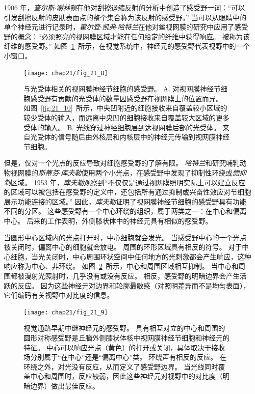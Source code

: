 1906 年，\textit{查尔斯$\cdot$谢林顿}在他对刮擦退缩反射的分析中创造了感受野一词：“可以引发刮擦反射的皮肤表面点的整个集合称为该反射的感受野。” 
当可以从眼睛中的单个神经元进行记录时，\textit{霍尔登$\cdot$凯弗$\cdot$哈特兰}在他对鲎视网膜的研究中应用了感受野的概念：“必须照亮的视网膜区域才能在任何给定的纤维中获得响应。
被称为该纤维的感受野。” 
如图~\ref{fig:21_8}~所示，在视觉系统中，神经元的感受野代表视野中的一个小窗口。


\begin{figure}[htbp]
	\centering
	\texttt{[image: chap21/fig\_21\_8]}
	\caption{与光受体相关的视网膜神经节细胞的感受野。
		A. 对视网膜神经节细胞感受野有贡献的光受体的数量因感受野在视网膜上的位置而异。
		如图~\ref{fig:21_10}~所示，中央凹附近的细胞接收来自覆盖较小区域的较少受体的输入，而远离中央凹的细胞接收来自覆盖较大区域的更多受体的输入。
		B. 光线穿过神经细胞层到达视网膜后部的光受体。
		来自光受体的信号随后由外核层和内核层中的神经元传输到视网膜神经节细胞。}
	\label{fig:21_8}
\end{figure}


但是，仅对一个光点的反应导致对细胞感受野的了解有限。
\textit{哈特兰}和研究哺乳动物视网膜的\textit{斯蒂芬$\cdot$库夫勒}使用两个小光点，在感受野中发现了抑制性环绕或\textit{侧抑制}区域。
1953 年，\textit{库夫勒}观察到“不仅仅是通过视网膜照明实际上可以建立反应的区域可以被包括在感受野的定义中，还包括所有通过抑制或兴奋性效应对节细胞展示功能连接的区域。” 
因此，\textit{库夫勒}证明了视网膜神经节细胞的感受野具有功能不同的分区。
这些感受野有一个中心环绕的组织，属于两类之一：在中心和偏离中心。
后来的工作表明，外侧膝状体中的神经元具有相似的感受野。


当圆形中心区域内的光点打开时，中心细胞就会发光。
当感受野中心的一个光点被关闭时，偏离中心的细胞就会放电。
周围的环形区域具有相反的符号。 
对于中心细胞，当光关闭时，中心周围环状空间中任何地方的光刺激都会产生响应，这种响应称为中心、非环绕。 
如图~\ref{fig:21_9}~所示，中心和周围区域相互抑制。
当中心和周围都被漫射光照射时，几乎没有或没有反应。 
相反，感受野的明暗边界会产生活跃的反应。
因为这些神经元对边界和轮廓最敏感（对照明差异而不是均匀表面），它们编码有关视野中对比度的信息。


\begin{figure}[htbp]
	\centering
	\texttt{[image: chap21/fig\_21\_9]}
	\caption{视觉通路早期中继神经元的感受野。
		具有相互对立的中心和周围的圆形对称感受野是丘脑外侧膝状体核中视网膜神经节细胞和神经元的特征。
		中心可以响应光点（黄色）的打开或关闭，具体取决于接收场分别属于“在中心”还是“偏离中心”类。
		环绕声有相反的反应。
		在环绕之外，对光没有反应，从而定义了感受野边界。
		当光线同时覆盖中心和周围时，反应较弱，因此这些神经元对视野中的对比度（明暗边界）做出最佳反应。}
	\label{fig:21_9}
\end{figure}


